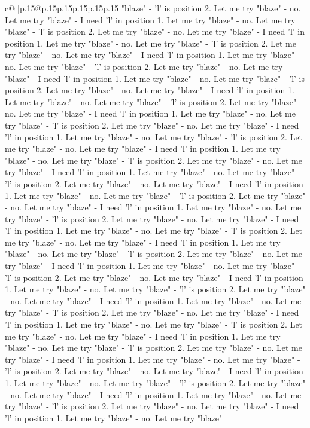 \documentclass{article}
\begin{document}
{\begin{supertabular}{c@{$\;$}|p{.15\linewidth}@{}p{.15\linewidth}p{.15\linewidth}p{.15\linewidth}p{.15\linewidth}p{.15\linewidth}}
{{{"blaze" {-} 'l' is position 2. Let me try "blaze" {-} no. Let me try "blaze" {-} I need 'l' in position 1. Let me try "blaze" {-} no. Let me try "blaze" {-} 'l' is position 2. Let me try "blaze" {-} no. Let me try "blaze" {-} I need 'l' in position 1. Let me try "blaze" {-} no. Let me try "blaze" {-} 'l' is position 2. Let me try "blaze" {-} no. Let me try "blaze" {-} I need 'l' in position 1. Let me try "blaze" {-} no. Let me try "blaze" {-} 'l' is position 2. Let me try "blaze" {-} no. Let me try "blaze" {-} I need 'l' in position 1. Let me try "blaze" {-} no. Let me try "blaze" {-} 'l' is position 2. Let me try "blaze" {-} no. Let me try "blaze" {-} I need 'l' in position 1. Let me try "blaze" {-} no. Let me try "blaze" {-} 'l' is position 2. Let me try "blaze" {-} no. Let me try "blaze" {-} I need 'l' in position 1. Let me try "blaze" {-} no. Let me try "blaze" {-} 'l' is position 2. Let me try "blaze" {-} no. Let me try "blaze" {-} I need 'l' in position 1. Let me try "blaze" {-} no. Let me try "blaze" {-} 'l' is position 2. Let me try "blaze" {-} no. Let me try "blaze" {-} I need 'l' in position 1. Let me try "blaze" {-} no. Let me try "blaze" {-} 'l' is position 2. Let me try "blaze" {-} no. Let me try "blaze" {-} I need 'l' in position 1. Let me try "blaze" {-} no. Let me try "blaze" {-} 'l' is position 2. Let me try "blaze" {-} no. Let me try "blaze" {-} I need 'l' in position 1. Let me try "blaze" {-} no. Let me try "blaze" {-} 'l' is position 2. Let me try "blaze" {-} no. Let me try "blaze" {-} I need 'l' in position 1. Let me try "blaze" {-} no. Let me try "blaze" {-} 'l' is position 2. Let me try "blaze" {-} no. Let me try "blaze" {-} I need 'l' in position 1. Let me try "blaze" {-} no. Let me try "blaze" {-} 'l' is position 2. Let me try "blaze" {-} no. Let me try "blaze" {-} I need 'l' in position 1. Let me try "blaze" {-} no. Let me try "blaze" {-} 'l' is position 2. Let me try "blaze" {-} no. Let me try "blaze" {-} I need 'l' in position 1. Let me try "blaze" {-} no. Let me try "blaze" {-} 'l' is position 2. Let me try "blaze" {-} no. Let me try "blaze" {-} I need 'l' in position 1. Let me try "blaze" {-} no. Let me try "blaze" {-} 'l' is position 2. Let me try "blaze" {-} no. Let me try "blaze" {-} I need 'l' in position 1. Let me try "blaze" {-} no. Let me try "blaze" {-} 'l' is position 2. Let me try "blaze" {-} no. Let me try "blaze" {-} I need 'l' in position 1. Let me try "blaze" {-} no. Let me try "blaze" {-} 'l' is position 2. Let me try "blaze" {-} no. Let me try "blaze" {-} I need 'l' in position 1. Let me try "blaze" {-} no. Let me try "blaze" {-} 'l' is position 2. Let me try "blaze" {-} no. Let me try "blaze" {-} I need 'l' in position 1. Let me try "blaze" {-} no. Let me try "blaze" {-} 'l' is position 2. Let me try "blaze" {-} no. Let me try "blaze" {-} I need 'l' in position 1. Let me try "blaze" {-} no. Let me try "blaze" {-} 'l' is position 2. Let me try "blaze" {-} no. Let me try "blaze" {-} I need 'l' in position 1. Let me try "blaze" {-} no. Let me try "blaze" {-} 'l' is position 2. Let me try "blaze" {-} no. Let me try "blaze" {-} I need 'l' in position 1. Let me try "blaze" {-} no. Let me try "blaze" }}}
\end{supertabular}}
\end{document}
